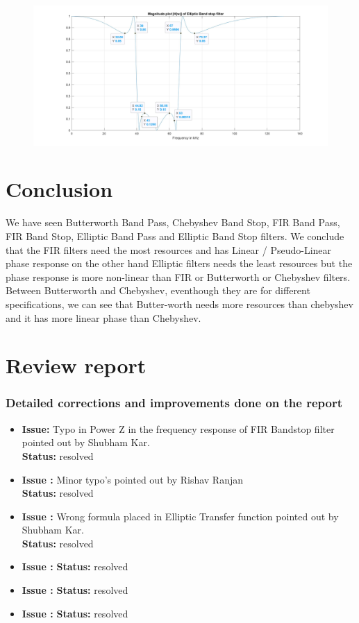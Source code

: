 \documentclass[12pt]{article}
\begin{document}
\begin{figure}[H]
	\centering
\	\includegraphics[width = 18cm, trim=0cm 0cm 0cm 0cm, clip]{Filter4DBSF.jpg}
\end{figure}


\color{darkblue}
\section{Conclusion}
\color{black}
We have seen Butterworth Band Pass, Chebyshev Band Stop, FIR Band Pass, FIR Band Stop, Elliptic Band Pass and Elliptic Band Stop filters. We conclude that the FIR filters need the most resources and has Linear / Pseudo-Linear phase response on the other hand Elliptic filters needs the least resources but the phase response is more non-linear than FIR or Butterworth or Chebyshev filters. Between Butterworth and Chebyshev, eventhough they are for different specifications, we can see that Butter-worth needs more resources than chebyshev and it has more linear phase than Chebyshev.

\color{darkblue}
\section{Review report}
\color{black}
\color{darkblue}
\subsubsection{Detailed corrections and improvements done on the report}
\color{black}
\begin{itemize}
	\item \textbf{Issue: }Typo in Power Z in the frequency response of FIR Bandstop filter pointed out by Shubham Kar.\\
	\textbf{Status: } resolved
	\item \textbf{Issue : }Minor typo's pointed out by Rishav Ranjan\\
	\textbf{Status: } resolved
	\item \textbf{Issue : }Wrong formula placed in Elliptic Transfer function pointed out by Shubham Kar.\\ 
	\textbf{Status: } resolved
	\item \textbf{Issue : }
	\textbf{Status: } resolved
	\item \textbf{Issue : }
	\textbf{Status: } resolved
	\item \textbf{Issue : }
	\textbf{Status: } resolved
	
\end{itemize}
\end{document}
